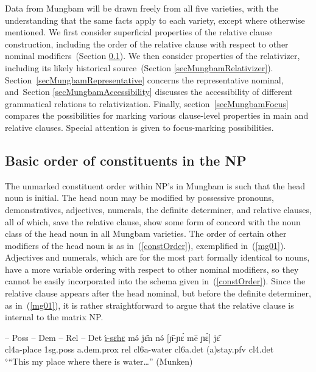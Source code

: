 \documentclass[10pt,twoside]{article}
\makeatletter
\newcommand{\cl}[1]{{\sc cl#1}}
\newcommand{\sref}[1]{Section \ref{#1}}
\def\elicited{$^\diamond$}
\def\HM#1{#1\symbol{"1DC7}}
\renewcommand{\i}{ı}
\def\@{ə}
\def\eh{ɛ}
\def\ny{ɲ}
\makeatother
\begin{document}
Data from Mungbam will be drawn freely from all five
varieties, with the understanding that the same facts apply
to each variety, except where otherwise mentioned.
We first consider superficial properties of the relative
clause construction, including the order of the relative
clause with respect to other nominal modifiers~(\sref{secMungbamOrder}).
We then consider properties of the relativizer, including its likely
historical source~(\sref{secMungbamRelativizer}).
Section~\ref{secMungbamRepresentative} concerns the
representative nominal, and~\sref{secMungbamAccessibility}
discusses the accessibility of different grammatical
relations to relativization.
Finally,
section~\ref{secMungbamFocus} compares the possibilities
for marking various clause-level properties in
main and relative clauses. Special attention is given
to focus-marking possibilities.
%
\subsection{Basic order of constituents in the NP}\label{secMungbamOrder}
%
The unmarked constituent order within NP's in Mungbam is such that
the head noun is initial. The head noun may be modified by
possessive pronouns, demonstratives, adjectives, numerals, the
definite determiner, and relative clauses, all of which,
save the relative clause,
show some form of concord with the noun class of the head noun
in all Mungbam varieties.\footnotemark\/
%
%
The order of certain other modifiers of
the head noun is as in~(\ref{constOrder}), exemplified in~(\ref{mg01}).
Adjectives and numerals, which are for the most part formally
identical to nouns, have a more variable ordering with respect
to other nominal modifiers, so they cannot be easily incorporated
into the schema given in~(\ref{constOrder}).
Since the relative clause appears after the head nominal, but
before the definite determiner,
as in~(\ref{mg01}), it is rather straightforward to argue that
the relative clause is internal to the matrix NP.
%
\begin{exe}
 -- {\sc Poss} -- {\sc Dem} -- {\sc Rel} -- {\sc Det}	\label{constOrder}	%
\ex \gll \uline{\'\i-s\HM{\eh}h{\eh}} m\'{\@} j\^{\eh}n n\'{\@} $[$\H{\ny}-\ny\'{\eh} m\={e} \ny\`{\eh}$]$ j\={\eh}	\\
\cl4a-place {\sc 1sg.poss} {\sc \cl4}a.{\sc dem.prox} {\sc rel} \cl6a-water \cl6a.{\sc det} ({\sc a})stay.{\sc pfv} {\sc cl4.det}		\\
\glt \elicited``This my place where there is water\dots'' (Munken)\footnotemark\label{mg01} %
\end{exe}
\end{document}
